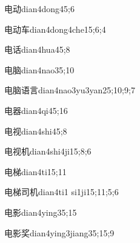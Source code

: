 \begin{verbete}{电动}{dian4dong4}{5;6}
\end{verbete}

\begin{verbete}{电动车}{dian4dong4che1}{5;6;4}
\end{verbete}

\begin{verbete}{电话}{dian4hua4}{5;8}
\end{verbete}

\begin{verbete}{电脑}{dian4nao3}{5;10}
\end{verbete}

\begin{verbete}{电脑语言}{dian4nao3yu3yan2}{5;10;9;7}
\end{verbete}

\begin{verbete}{电器}{dian4qi4}{5;16}
\end{verbete}

\begin{verbete}{电视}{dian4shi4}{5;8}
\end{verbete}

\begin{verbete}{电视机}{dian4shi4ji1}{5;8;6}
\end{verbete}

\begin{verbete}{电梯}{dian4ti1}{5;11}
\end{verbete}

\begin{verbete}{电梯司机}{dian4ti1 si1ji1}{5;11;5;6}
\end{verbete}

\begin{verbete}{电影}{dian4ying3}{5;15}
\end{verbete}

\begin{verbete}{电影奖}{dian4ying3jiang3}{5;15;9}
\end{verbete}

